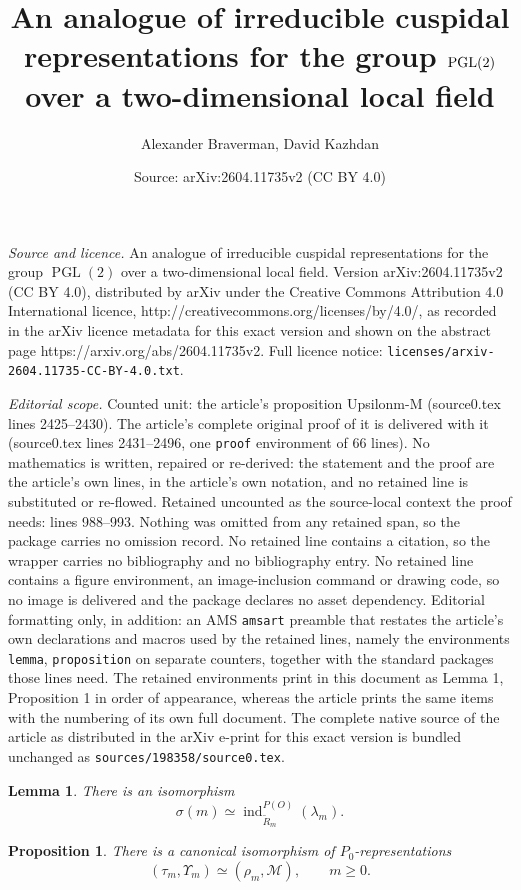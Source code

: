 \documentclass[10pt,a4paper]{amsart}
\title{An analogue of irreducible cuspidal representations for the group $\PGL(2)$ over a two-dimensional local field}
\author{Alexander Braverman, David Kazhdan}
\date{Source: arXiv:2604.11735v2 (CC BY 4.0)}
\newcommand{\PGL}{\operatorname{PGL}}
\newtheorem{lemma}{Lemma}
\newtheorem{proposition}{Proposition}
\newcommand{\bl}{\lambda}
\newcommand{\bs}{\sigma}
\newcommand{\ind}{\operatorname{ind}}
\newcommand{\mcM}{\mathcal M}
\begin{document}
\maketitle

\noindent\emph{Source and licence.} An analogue of irreducible cuspidal representations for the group $\PGL(2)$ over a two-dimensional local field. Version arXiv:2604.11735v2 (CC BY 4.0), distributed by arXiv under the Creative Commons Attribution 4.0 International licence, http://creativecommons.org/licenses/by/4.0/, as recorded in the arXiv licence metadata for this exact version and shown on the abstract page https://arxiv.org/abs/2604.11735v2. Full licence notice: \texttt{licenses/arxiv-2604.11735-CC-BY-4.0.txt}.\par\smallskip

\noindent\textit{Editorial scope.} Counted unit: the article's proposition Upsilonm-M (source0.tex lines 2425--2430). The article's complete original proof of it is delivered with it (source0.tex lines 2431--2496, one \texttt{proof} environment of 66 lines). No mathematics is written, repaired or re-derived: the statement and the proof are the article's own lines, in the article's own notation, and no retained line is substituted or re-flowed.  Retained uncounted as the source-local context the proof needs: lines 988--993.  Nothing was omitted from any retained span, so the package carries no omission record.  No retained line contains a citation, so the wrapper carries no bibliography and no bibliography entry.  No retained line contains a figure environment, an image-inclusion command or drawing code, so no image is delivered and the package declares no asset dependency.  Editorial formatting only, in addition: an AMS \texttt{amsart} preamble that restates the article's own declarations and macros used by the retained lines, namely the environments \texttt{lemma}, \texttt{proposition} on separate counters, together with the standard packages those lines need.  The retained environments print in this document as Lemma 1, Proposition 1 in order of appearance, whereas the article prints the same items with the numbering of its own full document.  The complete native source of the article as distributed in the arXiv e-print for this exact version is bundled unchanged as \texttt{sources/198358/source0.tex}.
\begin{lemma}\label{sec}
There is an isomorphism
$$
\bs(m)\simeq\ind_{\widetilde R_m}^{P(O)}(\bl_m).
$$
\end{lemma}

\begin{proposition}\label{Upsilonm-M}
There is a canonical isomorphism of $P_0$-representations
$$
(\tau_m,\Upsilon_m)\simeq(\rho_m,\mcM),\qquad m\geq0.
$$
\end{proposition}
\end{document}
